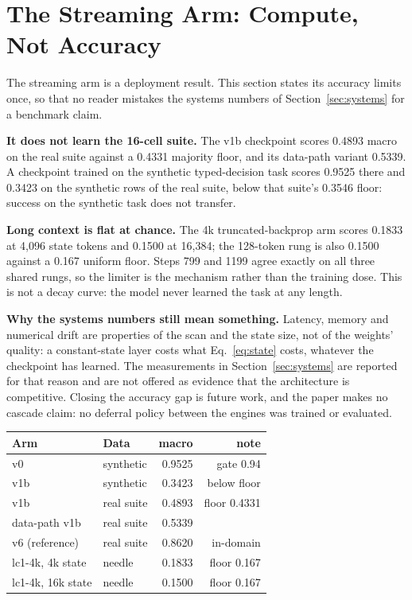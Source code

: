 \section{The Streaming Arm: Compute, Not Accuracy}
\label{sec:diagnostics}

The streaming arm is a deployment result. This section states its accuracy limits once, so that no
reader mistakes the systems numbers of Section~\ref{sec:systems} for a benchmark claim.

\textbf{It does not learn the 16-cell suite.}
The v1b checkpoint scores 0.4893 macro on the real suite against a 0.4331 majority floor, and its
data-path variant 0.5339. A checkpoint trained on the synthetic typed-decision task scores 0.9525
there and 0.3423 on the synthetic rows of the real suite, below that suite's 0.3546 floor: success
on the synthetic task does not transfer.

\textbf{Long context is flat at chance.}
The 4k truncated-backprop arm scores 0.1833 at 4{,}096 state tokens and 0.1500 at 16{,}384; the
128-token rung is also 0.1500 against a 0.167 uniform floor. Steps 799 and 1199 agree exactly on all
three shared rungs, so the limiter is the mechanism rather than the training dose. This is not a
decay curve: the model never learned the task at any length.

\textbf{Why the systems numbers still mean something.}
Latency, memory and numerical drift are properties of the scan and the state size, not of the
weights' quality: a constant-state layer costs what Eq.~\eqref{eq:state} costs, whatever the
checkpoint has learned. The measurements in Section~\ref{sec:systems} are reported for that reason
and are not offered as evidence that the architecture is competitive. Closing the accuracy gap is
future work, and the paper makes no cascade claim: no deferral policy between the engines was
trained or evaluated.

\begin{widetable}
\centering
\footnotesize
\caption{The small-engine accuracy diagnostics. Synthetic and real columns are different suites.
These rows bound the streaming prototype; they are not comparison arms.}
\label{tab:diagnostics}
\begin{tabular}{llrr}
\toprule
Arm & Data & macro & note \\
\midrule
v0 & synthetic & 0.9525 & gate 0.94 \\
v1b & synthetic & 0.3423 & below floor \\
v1b & real suite & 0.4893 & floor 0.4331 \\
data-path v1b & real suite & 0.5339 & \\
v6 (reference) & real suite & 0.8620 & in-domain \\
lc1-4k, 4k state & needle & 0.1833 & floor 0.167 \\
lc1-4k, 16k state & needle & 0.1500 & floor 0.167 \\
\bottomrule
\end{tabular}
\end{widetable}

